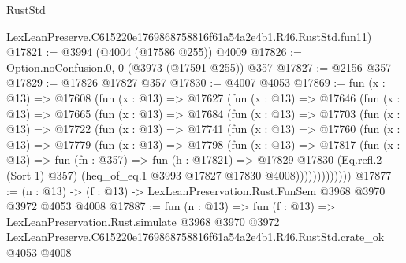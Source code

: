 \begin{lexlean}{RustStd}
\begin{coremodule}
    LexLeanPreserve.C615220e1769868758816f61a54a2e4b1.R46.RustStd.fun11)
@17821 := @3994 (@4004 (@17586 @255)) @4009
@17826 := Option.noConfusion.{0, 0} (@3973 (@17591 @255)) @357
@17827 := @2156 @357
@17829 := @17826 @17827 @357
@17830 := @4007 @4053
@17869 := fun (x : @13) =>
  @17608
    (fun (x : @13) =>
    @17627
      (fun (x : @13) =>
      @17646
        (fun (x : @13) =>
        @17665
          (fun (x : @13) =>
          @17684
            (fun (x : @13) =>
            @17703
              (fun (x : @13) =>
              @17722
                (fun (x : @13) =>
                @17741
                  (fun (x : @13) =>
                  @17760
                    (fun (x : @13) =>
                    @17779
                      (fun (x : @13) =>
                      @17798
                        (fun (x : @13) =>
                        @17817
                          (fun (x : @13) =>
                          fun (fn : @357) =>
                          fun (h : @17821) =>
                          @17829
                            @17830
                            (Eq.refl.{2} (Sort 1) @357)
                            (heq_of_eq.{1} @3993 @17827 @17830 @4008)))))))))))))
@17877 := (n : @13) -> (f : @13) -> LexLeanPreservation.Rust.FunSem @3968 @3970 @3972 @4053 @4008
@17887 := fun (n : @13) =>
  fun (f : @13) =>
  LexLeanPreservation.Rust.simulate
    @3968
    @3970
    @3972
    LexLeanPreserve.C615220e1769868758816f61a54a2e4b1.R46.RustStd.crate_ok
    @4053
    @4008
\end{coremodule}
\end{lexlean}
